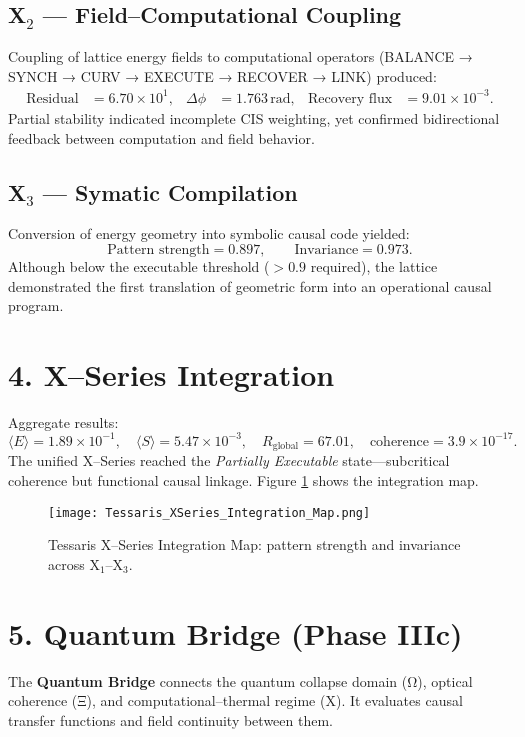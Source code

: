 \documentclass[11pt,a4paper]{article}
\begin{document}
\subsection*{X$_2$ — Field–Computational Coupling}
Coupling of lattice energy fields to computational operators (BALANCE → SYNCH → CURV → EXECUTE → RECOVER → LINK) produced:
\begin{align*}
\text{Residual} &= 6.70\times10^{1}, &
\Delta\phi &= 1.763\,\text{rad}, &
\text{Recovery flux} &= 9.01\times10^{-3}.
\end{align*}
Partial stability indicated incomplete CIS weighting, yet confirmed bidirectional feedback between computation and field behavior.

\subsection*{X$_3$ — Symatic Compilation}
Conversion of energy geometry into symbolic causal code yielded:
\[
\text{Pattern strength}=0.897, \qquad \text{Invariance}=0.973.
\]
Although below the executable threshold ($>0.9$ required), the lattice demonstrated the first translation of geometric form into an operational causal program.

\section{4. X–Series Integration}
Aggregate results:
\[
\langle E\rangle=1.89\times10^{-1},\quad 
\langle S\rangle=5.47\times10^{-3},\quad
R_{\text{global}}=67.01,\quad
\text{coherence}=3.9\times10^{-17}.
\]
The unified X–Series reached the \emph{Partially Executable} state—subcritical coherence but functional causal linkage.  
Figure \ref{fig:xintegration} shows the integration map.

\begin{figure}[h!]
\centering
\texttt{[image: Tessaris\_XSeries\_Integration\_Map.png]}
\caption{Tessaris X–Series Integration Map: pattern strength and invariance across X$_1$–X$_3$.}
\label{fig:xintegration}
\end{figure}

\section{5. Quantum Bridge (Phase IIIc)}
The \textbf{Quantum Bridge} connects the quantum collapse domain (Ω), optical coherence (Ξ), and computational–thermal regime (X).  
It evaluates causal transfer functions and field continuity between them.
\end{document}
